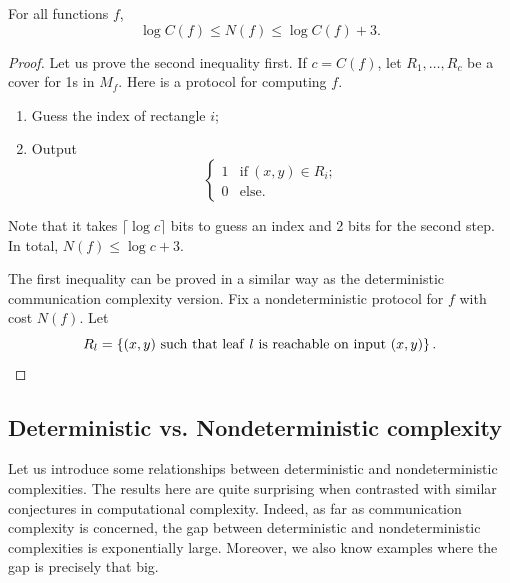 \documentclass[letterpaper]{article}
\providecommand\cbrac[1]{\ensuremath \left\{#1\right\}}
\newcommand{\mf}{M_f}
\newcommand{\nf}{N(f)}
\newcommand{\cf}{C(f)}
\begin{document}
\begin{theorem}
For all functions $f$,
$$
\log \cf \leq \nf \leq \log \cf + 3.
$$
\end{theorem}
\begin{proof}
Let us prove the second inequality first. If $c = \cf$, let $R_1, \ldots, R_c$ be a cover for 1s in $\mf$. Here is a protocol for computing $f$.
\begin{enumerate}
    \item Guess the index of rectangle $i$;
    \item Output
        $$
            \begin{cases}
            1 & \mathrm{if}\ (x,y) \in R_i;\\
            0 & \mathrm{else.}
            \end{cases}
         $$
\end{enumerate}
Note that it takes $\lceil \log c \rceil$ bits to guess an index and 2 bits for the second step. In total, $\nf \leq \log c + 3$.

The first inequality can be proved in a similar way as the deterministic communication complexity version. Fix a nondeterministic protocol for $f$ with cost $\nf$. Let
$$
R_l = \cbrac{ (x,y)\ \mathrm{such\ that\ leaf}\ l\ \mathrm{is\ reachable\ on\ input}\ (x,y) }.
$$

\end{proof}


\subsection{Deterministic vs. Nondeterministic complexity}

Let us introduce some relationships between deterministic and nondeterministic complexities. The results here are quite surprising when contrasted with similar conjectures in computational complexity. Indeed, as far as communication complexity is concerned, the gap between deterministic and nondeterministic complexities is exponentially large. Moreover, we also know examples where the gap is precisely that big.
\end{document}
